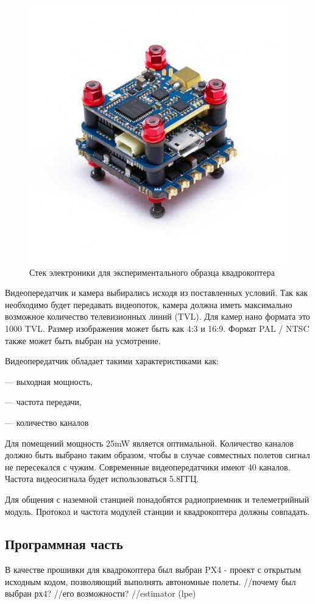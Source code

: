 \begin{figure}[H]
	\centering
	\includegraphics[width=0.5\linewidth]{pics/stack}
	\caption{Стек электроники для экспериментального образца квадрокоптера
	}
	\label{fig:stack} %
\end{figure}
Видеопередатчик и камера выбирались исходя из поставленных условий. Так как необходимо будет передавать видеопоток, камера должна иметь максимально возможное количество телевизионных линий (TVL). Для камер нано формата это 1000 TVL. Размер изображения может быть как 4:3 и 16:9. Формат PAL / NTSC также может быть выбран на усмотрение.

Видеопередатчик обладает такими характеристиками как:

--- выходная мощность,

--- частота передачи,

--- количество каналов

Для помещений мощность 25mW является оптимальной. Количество каналов должно быть выбрано таким образом, чтобы в случае совместных полетов сигнал не пересекался с чужим. Современные видеопередатчики имеют 40 каналов. Частота видеосигнала будет использоваться 5.8ГГЦ.

Для общения с наземной станцией понадобятся радиоприемник и телеметрийный модуль. Протокол и частота модулей станции и квадрокоптера должны совпадать.%

\subsection{Программная часть}
В качестве прошивки для квадрокоптера был выбран PX4 - проект с открытым исходным кодом, позволяющий выполнять автономные полеты.
//почему был выбран рх4?
//его возможности?
//estimator (lpe)
